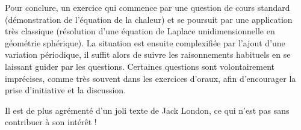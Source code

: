 \begin{solution}
Pour conclure, un exercice qui commence par une question de cours standard (démonstration de l'équation de la chaleur) et se poursuit par une application très classique (résolution d'une équation de Laplace unidimensionnelle en géométrie sphérique). La situation est ensuite complexifiée par l'ajout d'une variation périodique, il suffit alors de suivre les raisonnements habituels en se laissant guider par les questions. Certaines questions sont volontairement imprécises, comme très souvent dans les exercices d'oraux, afin d'encourager la prise d'initiative et la discussion.

Il est de plus agrémenté d'un joli texte de Jack London, ce qui n'est pas sans contribuer à son intérêt !

\end{solution}